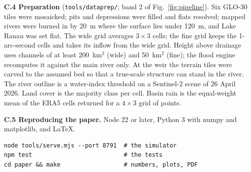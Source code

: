 \documentclass[10pt,a4paper,twocolumn]{extarticle}
\newcommand{\kmsq}{km$^2$}
\begin{document}
\textbf{C.4 Preparation} (\texttt{tools/dataprep/}; band 2 of Fig.~\ref{fig:pipeline}). Six GLO-30 tiles were mosaicked; pits and depressions were
filled and flats resolved; mapped rivers were burned in by 20~m where the surface lies under 120~m, and Lake Ranau
was set flat. The wide grid averages $3\times3$ cells; the fine grid keeps the 1-arc-second cells and takes its
inflow from the wide grid. Height above drainage uses channels of at least 200~\kmsq{} (wide) and 50~\kmsq{}
(fine); the flood engine recomputes it against the main river only. At the weir the terrain tiles were carved to the
assumed bed so that a true-scale structure can stand in the river. The river outline is a water-index threshold on
a Sentinel-2 scene of 26 April 2026. Land cover is the majority class per cell. Basin rain is the equal-weight mean
of the ERA5 cells returned for a $4\times3$ grid of points.

\textbf{C.5 Reproducing the paper.} Node 22 or later, Python 3 with numpy and matplotlib, and \LaTeX.
{\scriptsize
\begin{verbatim}
node tools/serve.mjs --port 8791  # the simulator
npm test                          # the tests
cd paper && make                  # numbers, plots, PDF
\end{verbatim}
}
\end{document}

